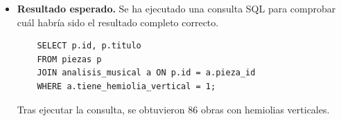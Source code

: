 \begin{itemize}
*   **Drum**
*   **Garryowen**
*   **Go to the devil and shake yourself**
*   **Jackson`s Favorite**
*   **Jackson´s Morning Brush**
*   **Kennedys´s Jig**
*   **King Charle´s Jig**
*   **Kissing and drinking**
*   **Kitty of Coleraine**
*   **Paddy O´Carrol**"
    \item \textbf{Resultado esperado.} Se ha ejecutado una consulta SQL para comprobar cuál habría sido el resultado completo correcto.
    \begin{verbatim}
    SELECT p.id, p.titulo
    FROM piezas p
    JOIN analisis_musical a ON p.id = a.pieza_id
    WHERE a.tiene_hemiolia_vertical = 1;
    \end{verbatim}
    Tras ejecutar la consulta, se obtuvieron 86 obras con hemiolias verticales.


\end{itemize}

